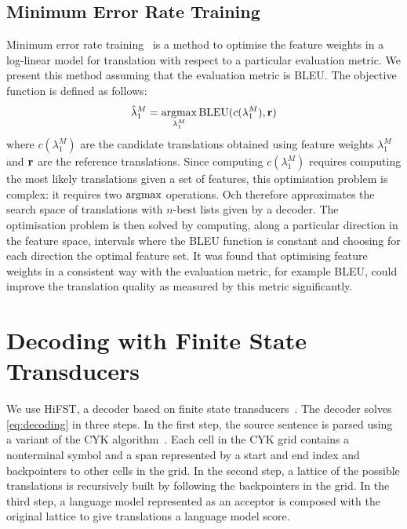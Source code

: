     \subsection{Minimum Error Rate Training}
    \label{sec:mert}

    Minimum error rate training~\citep{och:2003:ACL} is a method to optimise the feature weights
    in a log-linear model for translation with respect to a particular evaluation metric. We present
    this method assuming that the evaluation metric is BLEU. The objective function is defined 
    as follows:
%
    \begin{equation}
      \hat{\lambda}_1^M = \operatorname*{argmax}_{\lambda_1^M} \mbox{BLEU}(c(\lambda_1^M), {\bf r}) 
    \end{equation}
%
    where $c(\lambda_1^M)$ are the candidate translations obtained using feature
    weights $\lambda_1^M$ and ${\bf r}$ are the reference translations. Since computing $c(\lambda_1^M)$
    requires computing the most likely translations given a set of features, this
    optimisation problem is complex: it requires two $\operatorname*{argmax}$ operations. Och therefore approximates the search space of translations
    with $n$-best lists given by a decoder. The optimisation problem is then solved by 
    computing, along a particular direction in the feature space, intervals where the BLEU function 
    is constant and choosing for each direction the optimal feature set. It was found
    that optimising feature weights in a consistent way with the evaluation metric, for example
    BLEU, could improve the translation quality as measured by this metric significantly.


\section{Decoding with Finite State Transducers}
\label{sec:hifst}
  
We use HiFST, a decoder based on finite state transducers~\citep{iglesias-degispert-banga-byrne:2009:NAACL}.
The decoder solves \autoref{eq:decoding} in three steps. In the first step, the source
sentence is parsed using a variant of the CYK algorithm~\citep{chappelier-rahman:1998:TAPD}. Each cell in the CYK
grid contains a nonterminal symbol and a span represented by a start and
end index and backpointers to other cells in the grid. In the second step, a lattice of the possible translations 
is recursively built by following the backpointers in the grid.
In the third step, a language model represented as an acceptor is composed
with the original lattice to give translations a language model score.

